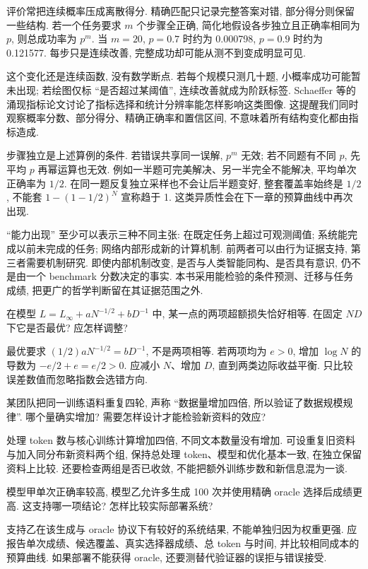\label{sec:progress-emergence}
评价常把连续概率压成离散得分. 精确匹配只记录完整答案对错, 部分得分则保留一些结构. 若一个任务要求 $m$ 个步骤全正确, 简化地假设各步独立且正确率相同为 $p$, 则总成功率为 $p^m$. 当 $m=20$, $p=0.7$ 时约为 0.000798, $p=0.9$ 时约为 0.121577. 每步只是连续改善, 完整成功却可能从测不到变成明显可见.

这个变化还是连续函数, 没有数学断点. 若每个规模只测几十题, 小概率成功可能暂未出现; 若绘图仅标 ``是否超过某阈值'', 连续改善就成为阶跃标签. Schaeffer 等的涌现指标论文讨论了指标选择和统计分辨率能怎样影响这类图像\cite{emergence}. 这提醒我们同时观察概率分数、部分得分、精确正确率和置信区间, 不意味着所有结构变化都由指标造成.

步骤独立是上述算例的条件. 若错误共享同一误解, $p^m$ 无效; 若不同题有不同 $p$, 先平均 $p$ 再幂运算也无效. 例如一半题可完美解决、另一半完全不能解决, 平均单次正确率为 $1/2$. 在同一题反复独立采样也不会让后半题变好, 整套覆盖率始终是 $1/2$, 不能套 $1-(1-1/2)^N$ 宣称趋于 1. 这类异质性会在下一章的预算曲线中再次出现.

``能力出现'' 至少可以表示三种不同主张: 在既定任务上超过可观测阈值; 系统能完成以前未完成的任务; 网络内部形成新的计算机制. 前两者可以由行为证据支持, 第三者需要机制研究. 即使内部机制改变, 是否与人类智能同构、是否具有意识, 仍不是由一个 benchmark 分数决定的事实. 本书采用能检验的条件预测、迁移与任务成绩, 把更广的哲学判断留在其证据范围之外.

\label{sec:progress-practice}
\begin{exercise}
在模型 $L=L_\infty+aN^{-1/2}+bD^{-1}$ 中, 某一点的两项超额损失恰好相等. 在固定 $ND$ 下它是否最优? 应怎样调整?
\end{exercise}
\begin{solution}
最优要求 $(1/2)aN^{-1/2}=bD^{-1}$, 不是两项相等. 若两项均为 $e>0$, 增加 $\log N$ 的导数为 $-e/2+e=e/2>0$. 应减小 $N$、增加 $D$, 直到两类边际收益平衡. 只比较误差数值而忽略指数会选错方向.
\end{solution}
\begin{exercise}
某团队把同一训练语料重复四轮, 声称 ``数据量增加四倍, 所以验证了数据规模规律''. 哪个量确实增加? 需要怎样设计才能检验新资料的效应?
\end{exercise}
\begin{solution}
处理 token 数与核心训练计算增加四倍, 不同文本数量没有增加. 可设重复旧资料与加入同分布新资料两个组, 保持总处理 token、模型和优化基本一致, 在独立保留资料上比较. 还要检查两组是否已收敛, 不能把额外训练步数和新信息混为一谈.
\end{solution}
\begin{exercise}
模型甲单次正确率较高, 模型乙允许多生成 100 次并使用精确 oracle 选择后成绩更高. 这支持哪一项结论? 怎样比较实际部署系统?
\end{exercise}
\begin{solution}
支持乙在该生成与 oracle 协议下有较好的系统结果, 不能单独归因为权重更强. 应报告单次成绩、候选覆盖、真实选择器成绩、总 token 与时间, 并比较相同成本的预算曲线. 如果部署不能获得 oracle, 还要测替代验证器的误拒与错误接受.
\end{solution}
\label{ch:end:09}
